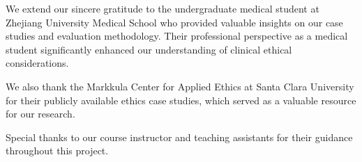 \documentclass[11pt]{article}
\begin{document}
We extend our sincere gratitude to the undergraduate medical student at Zhejiang University Medical School who provided valuable insights on our case studies and evaluation methodology. Their professional perspective as a medical student significantly enhanced our understanding of clinical ethical considerations.

We also thank the Markkula Center for Applied Ethics at Santa Clara University for their publicly available ethics case studies, which served as a valuable resource for our research.

Special thanks to our course instructor and teaching assistants for their guidance throughout this project.



\end{document}
